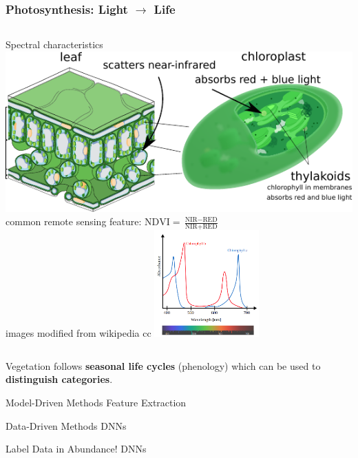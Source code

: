 \documentclass{beamer}
\begin{document}
	
	\begin{frame}
		\frametitle{Photosynthesis: Light $\rightarrow$ Life}
		
		\begin{columns}[b]
			Spectral characteristics
			\includegraphics[width=\textwidth]{images/leaf_smallannot.pdf}
			common remote sensing feature: $\text{NDVI} = \frac{\text{NIR} - \text{RED}}{\text{NIR} + \text{RED}}$ \\
			{\scriptsize images modified from wikipedia cc}
			\includegraphics[width=4cm]{images/chlorophyll/Chlorophyll_ab_spectra-en}
			
		\end{columns}
		
		\vspace{2em}
		Vegetation follows \textbf{seasonal life cycles} (phenology) which can be used to \textbf{distinguish categories}. 
		
	\end{frame}

	\begin{frame}{Model-Driven Methods}
		Feature Extraction		
	\end{frame}

	\begin{frame}{Data-Driven Methods}
		DNNs
	\end{frame}
		
	\begin{frame}{Label Data in Abundance!}
		DNNs
	\end{frame}
\end{document}
